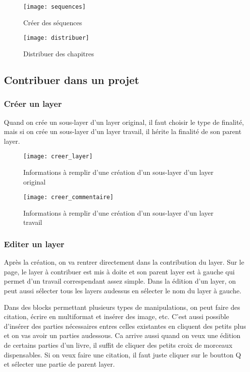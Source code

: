 \begin{figure}[H]
\centering
\texttt{[image: sequences]}
\caption{Créer des séquences}
\end{figure}

\begin{figure}[H]
\centering
\texttt{[image: distribuer]}
\caption{Distribuer des chapitres}
\end{figure}

\subsection{Contribuer dans un projet}

\subsubsection{Créer un layer}

Quand on crée un sous-layer d'un layer original, il faut choisir le type de finalité, mais si on crée un sous-layer d'un layer travail, il hérite la finalité de son parent layer.

\begin{figure}[H]
\centering
\texttt{[image: creer\_layer]}
\caption{Informations à remplir d'une création d'un sous-layer d'un layer original}
\end{figure}

\begin{figure}[H]
\centering
\texttt{[image: creer\_commentaire]}
\caption{Informations à remplir d'une création d'un sous-layer d'un layer travail}
\end{figure}

\subsubsection{Editer un layer}

Après la création, on va rentrer directement dans la contribution du layer. Sur le page, le layer à contribuer est mis à doite et son parent layer est à gauche qui permet d'un travail correspendant assez simple. Dans la édition d'un layer, on peut aussi sélecter tous les layers audessus en sélecter le nom du layer à gauche.

Dans des blocks permettant plusieurs types de manipulations, on peut faire des citation, écrire en multiformat et insérer des image, etc. C'est aussi possible d'insérer des parties nécessaires entres celles existantes en cliquent des petits plus et on vas avoir un parties audessous. Ca arrive aussi quand on veux une édition de certains parties d'un livre, il suffit de cliquer des petits croix de morceaux dispensables. Si on veux faire une citation, il faut juste cliquer sur le boutton Q et sélecter une partie de parent layer.

